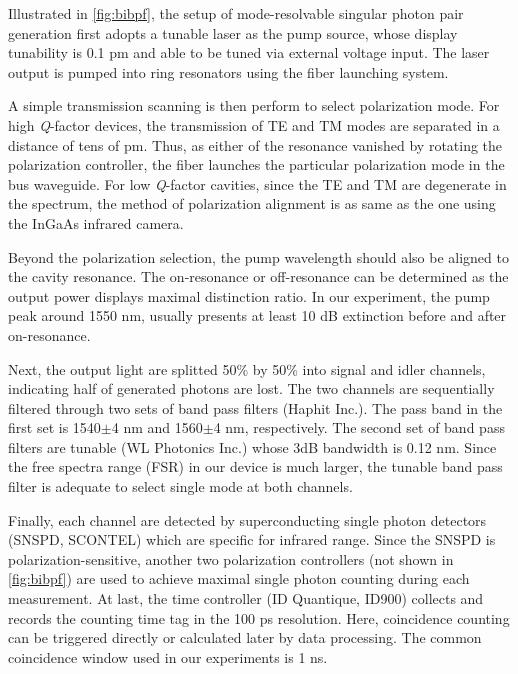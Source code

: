 Illustrated in \autoref{fig:bibpf}, the setup of mode-resolvable singular photon pair generation first adopts a tunable laser as the pump source, whose display tunability is 0.1 pm and able to be tuned via external voltage input. The laser output is pumped into ring resonators using the fiber launching system.%

A simple transmission scanning is then perform to select polarization mode.
For high \textit{Q}-factor devices, the transmission of TE and TM modes are separated in a distance of tens of pm. Thus, as either of the resonance vanished by rotating the polarization controller, the fiber launches the particular polarization mode in the bus waveguide. For low \textit{Q}-factor cavities, since the TE and TM are degenerate in the spectrum, the method of polarization alignment is as same as the one using the InGaAs infrared camera.

Beyond the polarization selection, the pump wavelength should also be aligned to the cavity resonance. The on-resonance or off-resonance can be determined as the output power displays maximal distinction ratio. In our experiment, the pump peak around 1550 nm, usually presents at least 10 dB extinction before and after on-resonance.

Next, the output light are splitted 50\si{\percent} by 50\si{\percent} into signal and idler channels, indicating half of generated photons are lost. The two channels are sequentially filtered through two sets of band pass filters (Haphit Inc.). The pass band in the first set is 1540$\pm$4 nm and 1560$\pm$4 nm, respectively. The second set of band pass filters are tunable (WL Photonics Inc.) whose 3dB bandwidth is 0.12 nm. Since the free spectra range (FSR) in our device is much larger, the tunable band pass filter is adequate to select single mode at both channels.

Finally, each channel are detected by superconducting single photon detectors (SNSPD, SCONTEL) which are specific for infrared range. Since the SNSPD is polarization-sensitive, another two polarization controllers (not shown in \autoref{fig:bibpf}) are used to achieve maximal single photon counting during each measurement. At last, the time controller (ID Quantique, ID900) collects and records the counting time tag in the 100 ps resolution. Here, coincidence counting can be triggered directly or calculated later by data processing. The common coincidence window used in our experiments is 1 ns.

